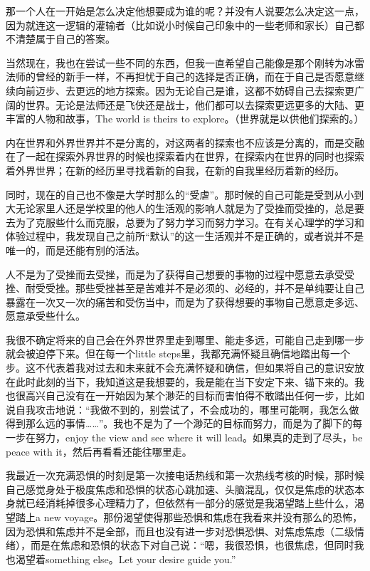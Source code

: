 那一个人在一开始是怎么决定他想要成为谁的呢？并没有人说要怎么决定这一点，因为就连这一逻辑的灌输者（比如说小时候自己印象中的一些老师和家长）自己都不清楚属于自己的答案。

当然现在，我也在尝试一些不同的东西，但我一直希望自己能像是那个刚转为冰雷法师的曾经的新手一样，不再担忧于自己的选择是否正确，而在于自己是否愿意继续向前迈步、去更远的地方探索。因为无论自己是谁，这都不妨碍自己去探索更广阔的世界。无论是法师还是飞侠还是战士，他们都可以去探索更远更多的大陆、更丰富的人物和故事，The world is theirs to explore。（世界就是以供他们探索的。）

内在世界和外界世界并不是分离的，对这两者的探索也不应该是分离的，而是交融在了一起\pozhehao{}在探索外界世界的时候也探索着内在世界，在探索内在世界的同时也探索着外界世界；在新的经历里寻找着新的自我，在新的自我里经历着新的经历。

同时，现在的自己也不像是大学时那么的“受虐”。那时候的自己可能是受到从小到大无论家里人还是学校里的他人的生活观的影响\pozhehao{}人就是为了受挫而受挫的，总是要去为了克服些什么而克服，总要为了努力学习而努力学习。在有关心理学的学习和体验过程中，我发现自己之前所“默认”的这一生活观并不是正确的，或者说并不是唯一的，而是还能有别的活法。

人不是为了受挫而去受挫，而是为了获得自己想要的事物的过程中愿意去承受受挫、耐受受挫。那些受挫甚至是苦难并不是必须的、必经的，并不是单纯要让自己暴露在一次又一次的痛苦和受伤当中，而是为了获得想要的事物自己愿意走多远、愿意承受些什么。

我很不确定将来的自己会在外界世界里走到哪里、能走多远，可能自己走到哪一步就会被迫停下来。但在每一个little steps里，我都充满怀疑且确信地踏出每一个步。这不代表着我对过去和未来就不会充满怀疑和确信，但如果将自己的意识安放在此时此刻的当下，我知道这是我想要的，我是能在当下安定下来、锚下来的。我也很高兴自己没有在一开始因为某个渺茫的目标而害怕得不敢踏出任何一步，比如说自我攻击地说：“我做不到的，别尝试了，不会成功的，哪里可能啊，我怎么做得到那么远的事情……”。我也不是为了一个渺茫的目标而努力，而是为了脚下的每一步在努力，enjoy the view and see where it will lead。如果真的走到了尽头，be peace with it，然后再看看还能往哪里走。

我最近一次充满恐惧的时刻是第一次接电话热线和第一次热线考核的时候，那时候自己感觉身处于极度焦虑和恐惧的状态\pozhehao{}心跳加速、头脑混乱，仅仅是焦虑的状态本身就已经消耗掉很多心理精力了，但依然有一部分的感觉是\pozhehao{}我渴望踏上些什么，渴望踏上a new voyage。那份渴望使得那些恐惧和焦虑在我看来并没有那么的恐怖，因为恐惧和焦虑并不是全部，而且也没有进一步对恐惧恐惧、对焦虑焦虑（二级情绪），而是在焦虑和恐惧的状态下对自己说：“嗯，我很恐惧，也很焦虑，但同时我也渴望着something else。Let your desire guide you.”


